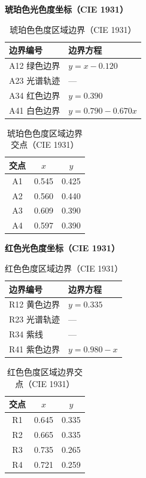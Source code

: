 \textbf{琥珀色光色度坐标（CIE 1931）}

\begin{table}[H]
\centering
\caption{琥珀色色度区域边界（CIE 1931）}
\begin{tabular}{|l|l|}
\hline
\textbf{边界编号} & \textbf{边界方程} \\
\hline
A12 绿色边界  & $y = x - 0.120$ \\
\hline
A23 光谱轨迹   & --- \\
\hline
A34 红色边界  & $y = 0.390$ \\
\hline
A41 白色边界  & $y = 0.790 - 0.670x$ \\
\hline
\end{tabular}
\end{table}

\begin{table}[H]
\centering
\caption{琥珀色色度区域边界交点（CIE 1931）}
\begin{tabular}{|c|c|c|}
\hline
\textbf{交点} & \textbf{$x$} & \textbf{$y$} \\
\hline
A1 & 0.545 & 0.425 \\
\hline
A2 & 0.560 & 0.440 \\
\hline
A3 & 0.609 & 0.390 \\
\hline
A4 & 0.597 & 0.390 \\
\hline
\end{tabular}
\end{table}

\textbf{红色光色度坐标（CIE 1931）}

\begin{table}[H]
\centering
\caption{红色色度区域边界（CIE 1931）}
\begin{tabular}{|l|l|}
\hline
\textbf{边界编号} & \textbf{边界方程} \\
\hline
R12 黄色边界  & $y = 0.335$ \\
\hline
R23 光谱轨迹   & --- \\
\hline
R34 紫线       & --- \\
\hline
R41 紫色边界  & $y = 0.980 - x$ \\
\hline
\end{tabular}
\end{table}

\begin{table}[H]
\centering
\caption{红色色度区域边界交点（CIE 1931）}
\begin{tabular}{|c|c|c|}
\hline
\textbf{交点} & \textbf{$x$} & \textbf{$y$} \\
\hline
R1 & 0.645 & 0.335 \\
\hline
R2 & 0.665 & 0.335 \\
\hline
R3 & 0.735 & 0.265 \\
\hline
R4 & 0.721 & 0.259 \\
\hline
\end{tabular}
\end{table}

